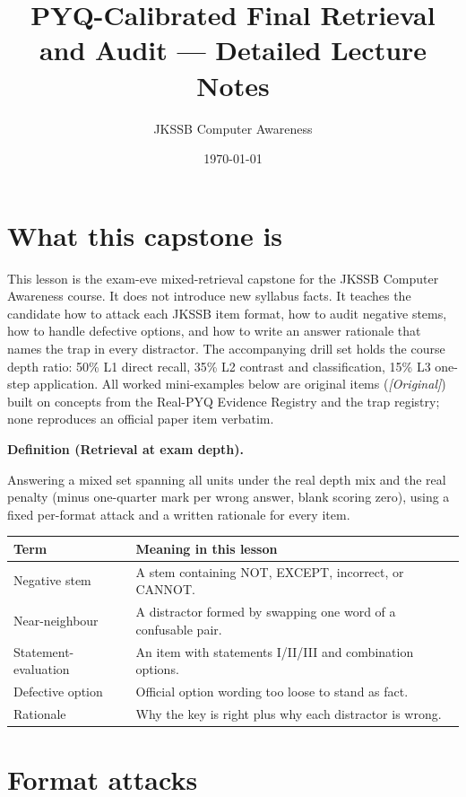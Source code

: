 \documentclass[11pt]{article}
\title{PYQ-Calibrated Final Retrieval and Audit --- Detailed Lecture Notes}
\author{JKSSB Computer Awareness}
\date{\today}
\newenvironment{definitionbox}[1]{%
  \par\noindent\textbf{Definition (#1).}\ \itshape
}{\par\vspace{0.3em}}
\begin{document}
\maketitle

\section{What this capstone is}
This lesson is the exam-eve mixed-retrieval capstone for the JKSSB Computer
Awareness course. It does not introduce new syllabus facts. It teaches the
candidate how to attack each JKSSB item format, how to audit negative stems,
how to handle defective options, and how to write an answer rationale that
names the trap in every distractor. The accompanying drill set holds the
course depth ratio: 50\% L1 direct recall, 35\% L2 contrast and
classification, 15\% L3 one-step application. All worked mini-examples below
are original items (\textit{[Original]}) built on concepts from the
Real-PYQ Evidence Registry and the trap registry; none reproduces an
official paper item verbatim.

\begin{definitionbox}{Retrieval at exam depth}
Answering a mixed set spanning all units under the real depth mix and the
real penalty (minus one-quarter mark per wrong answer, blank scoring zero),
using a fixed per-format attack and a written rationale for every item.
\end{definitionbox}

\begin{center}
\begin{tabular}{p{}p{}}
\toprule
\textbf{Term} & \textbf{Meaning in this lesson} \\
\midrule
Negative stem & A stem containing NOT, EXCEPT, incorrect, or CANNOT. \\
Near-neighbour & A distractor formed by swapping one word of a confusable pair. \\
Statement-evaluation & An item with statements I/II/III and combination options. \\
Defective option & Official option wording too loose to stand as fact. \\
Rationale & Why the key is right plus why each distractor is wrong. \\
\bottomrule
\end{tabular}
\end{center}

\section{Format attacks}
\end{document}
